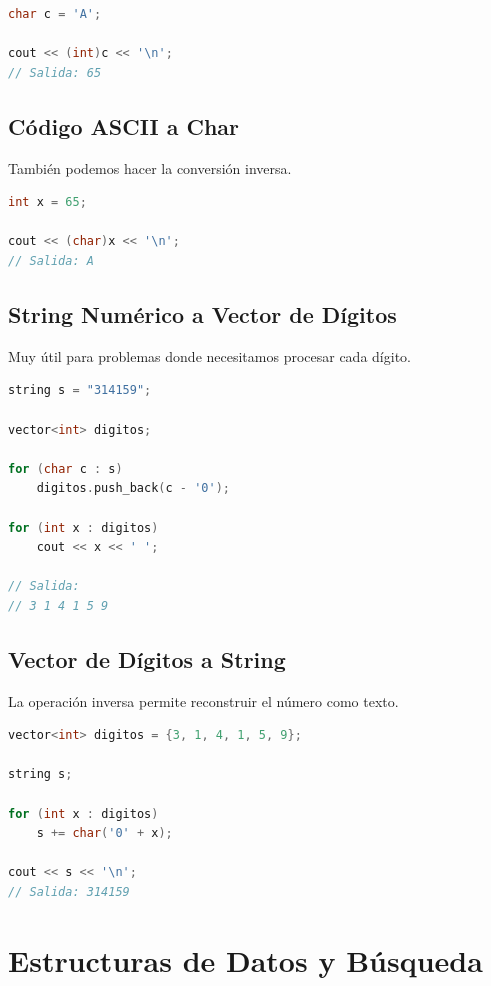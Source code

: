 \documentclass[10pt,twocolumn,letterpaper]{report}
\begin{document}
\begin{lstlisting}[language=C++]
char c = 'A';

cout << (int)c << '\n';
// Salida: 65
\end{lstlisting}

\section{Código ASCII a Char}
También podemos hacer la conversión inversa.

\begin{lstlisting}[language=C++]
int x = 65;

cout << (char)x << '\n';
// Salida: A
\end{lstlisting}

\section{String Numérico a Vector de Dígitos}
Muy útil para problemas donde necesitamos procesar cada dígito.

\begin{lstlisting}[language=C++]
string s = "314159";

vector<int> digitos;

for (char c : s)
    digitos.push_back(c - '0');

for (int x : digitos)
    cout << x << ' ';

// Salida:
// 3 1 4 1 5 9
\end{lstlisting}

\section{Vector de Dígitos a String}
La operación inversa permite reconstruir el número como texto.

\begin{lstlisting}[language=C++]
vector<int> digitos = {3, 1, 4, 1, 5, 9};

string s;

for (int x : digitos)
    s += char('0' + x);

cout << s << '\n';
// Salida: 314159
\end{lstlisting}

\chapter{Estructuras de Datos y Búsqueda}
\end{document}
